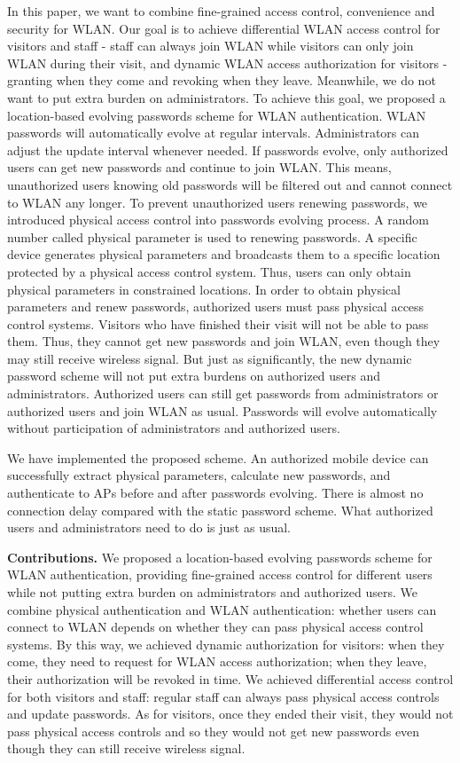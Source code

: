 In this paper, we want to combine fine-grained access control, convenience and security for WLAN. Our goal is to achieve differential WLAN access control for visitors and staff - staff can always join WLAN while visitors can only join WLAN during their visit, and dynamic WLAN access authorization for visitors - granting when they come and revoking when they leave. Meanwhile, we do not want to put extra burden on administrators. To achieve this goal, we proposed a location-based evolving passwords scheme for WLAN authentication. WLAN passwords will automatically evolve at regular intervals. Administrators can adjust the update interval whenever needed. If passwords evolve, only authorized users can get new passwords and continue to join WLAN. This means, unauthorized users knowing old passwords will be filtered out and cannot connect to WLAN any longer. To prevent unauthorized users renewing passwords, we introduced physical access control into passwords evolving process. A random number called physical parameter is used to renewing passwords. A specific device generates physical parameters and broadcasts them to a specific location protected by a physical access control system. Thus, users can only obtain physical parameters in constrained locations. In order to obtain physical parameters and renew passwords, authorized users must pass physical access control systems. Visitors who have finished their visit will not be able to pass them. Thus, they cannot get new passwords and join WLAN, even though they may still receive wireless signal. But just as significantly, the new dynamic password scheme will not put extra burdens on authorized users and administrators. Authorized users can still get passwords from administrators or authorized users and join WLAN as usual. Passwords will evolve automatically without participation of administrators and authorized users. 

We have implemented the proposed scheme. An authorized mobile device can successfully extract physical parameters, calculate new passwords, and authenticate to APs before and after passwords evolving. There is almost no connection delay compared with the static password scheme. What authorized users and administrators need to do is just as usual. 

\textbf{Contributions.} We proposed a location-based evolving passwords scheme for WLAN authentication, providing fine-grained access control for different users while not putting extra burden on administrators and authorized users. We combine physical authentication and WLAN authentication: whether users can connect to WLAN depends on whether they can pass physical access control systems. By this way, we achieved dynamic authorization for visitors: when they come, they need to request for WLAN access authorization; when they leave, their authorization will be revoked in time. We achieved differential access control for both visitors and staff: regular staff can always pass physical access controls and update passwords. As for visitors, once they ended their visit, they would not pass physical access controls and so they would not get new passwords even though they can still receive wireless signal. 


